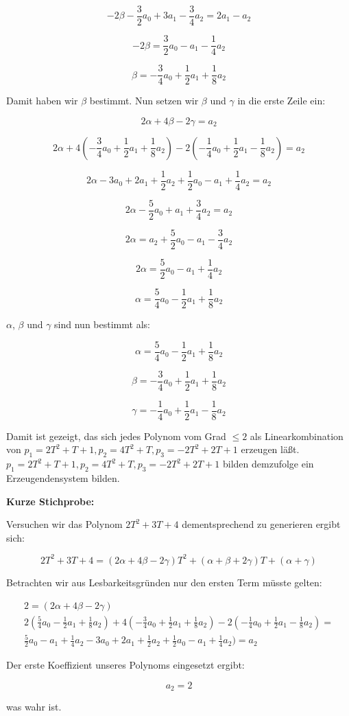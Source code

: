 \documentclass{article}
\begin{document}
\[
-2\beta - \frac{3}{2}a_{0} + 3a_{1} - \frac{3}{4}a_{2} = 2a_{1} - a_{2}
\]

\[
-2\beta = \frac{3}{2}a_{0} - a_{1} - \frac{1}{4}a_{2}
\]

\[
\beta = -\frac{3}{4}a_{0} + \frac{1}{2}a_{1} + \frac{1}{8}a_{2}
\]

Damit haben wir \(\beta\) bestimmt. Nun setzen wir \(\beta\) und \(\gamma\) in die erste Zeile ein:

\[
2\alpha + 4\beta - 2\gamma = a_{2}
\]

\[
2\alpha + 4(-\frac{3}{4}a_{0} + \frac{1}{2}a_{1} + \frac{1}{8}a_{2}) - 2(-\frac{1}{4}a_{0} + \frac{1}{2}a_{1} - \frac{1}{8}a_{2}) = a_{2}
\]

\[
2\alpha -3a_{0} + 2a_{1} + \frac{1}{2}a_{2} + \frac{1}{2}a_{0} - a_{1} + \frac{1}{4}a_{2} = a_{2}
\]

\[
2\alpha - \frac{5}{2}a_{0} + a_{1} + \frac{3}{4}a_{2} = a_{2}
\]

\[
2\alpha = a_{2} + \frac{5}{2}a_{0} - a_{1} - \frac{3}{4}a_{2}
\]

\[
2\alpha = \frac{5}{2}a_{0} - a_{1} + \frac{1}{4}a_{2}
\]

\[
\alpha = \frac{5}{4}a_{0} - \frac{1}{2}a_{1} + \frac{1}{8}a_{2}
\]

\(\alpha\), \(\beta\) und \(\gamma\) sind nun bestimmt als:

\[
\alpha = \frac{5}{4}a_{0} - \frac{1}{2}a_{1} + \frac{1}{8}a_{2}
\]

\[
\beta = -\frac{3}{4}a_{0} + \frac{1}{2}a_{1} + \frac{1}{8}a_{2}
\]

\[
\gamma = -\frac{1}{4}a_{0} + \frac{1}{2}a_{1} - \frac{1}{8}a_{2}
\]

Damit ist gezeigt, das sich jedes Polynom vom Grad \(\leq 2\) als Linearkombination von \(p_{1} = 2T^2 + T + 1, p_{2} = 4T^2 + T, p_{3} = - 2T^2 + 2T + 1\) erzeugen läßt. \(p_{1} = 2T^2 + T + 1, p_{2} = 4T^2 + T, p_{3} = - 2T^2 + 2T + 1\) bilden demzufolge ein Erzeugendensystem bilden.

\textbf{Kurze Stichprobe:}

Versuchen wir das Polynom \(2T^2 + 3T + 4\) dementsprechend zu generieren ergibt sich:

\[
2T^2 + 3T + 4 = (2 \alpha + 4\beta -2\gamma) T^2 + (\alpha + \beta + 2\gamma) T + (\alpha  + \gamma)
\]

Betrachten wir aus Lesbarkeitsgründen nur den ersten Term müsste gelten:

\[
\begin{split}
2 = (2 \alpha + 4\beta -2\gamma) \\
2(\frac{5}{4}a_{0} - \frac{1}{2}a_{1} + \frac{1}{8}a_{2}) + 4(-\frac{3}{4}a_{0} + \frac{1}{2}a_{1} + \frac{1}{8}a_{2}) - 2(-\frac{1}{4}a_{0} + \frac{1}{2}a_{1} - \frac{1}{8}a_{2}) =
\\
\frac{5}{2}a_{0} - a_{1} + \frac{1}{4}a_{2} - 3a_{0} + 2a_{1} + \frac{1}{2}a_{2} + \frac{1}{2}a_{0} - a_{1} + \frac{1}{4}a_{2}) = a_{2}
\end{split}
\]

Der erste Koeffizient unseres Polynoms eingesetzt ergibt:

\[
a_{2} = 2
\]

was wahr ist.
\end{document}

